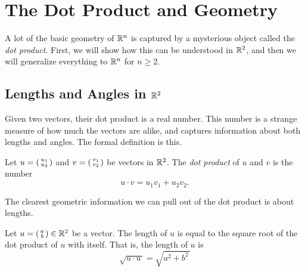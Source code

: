 \documentclass[elementsmain.tex]{subfiles}
\begin{document}
\section{The Dot Product and Geometry}

A lot of the basic geometry of $\mathbb{R}^n$ is captured by a mysterious object called the \emph{dot product}. First, we will show how this can be understood in $\R^2$, and then we will generalize everything to $\mathbb{R}^n$ for $n\geq 2$.

\subsection*{Lengths and Angles in $\R^2$}

Given two vectors, their dot product is a real number. This number is a strange measure of how much the vectors are alike, and captures information about both lengths and angles. The formal definition is this.

\begin{definition}
Let $u = \left(\begin{smallmatrix} u_1 \\ u_2 \end{smallmatrix}\right)$ and $v = \left(\begin{smallmatrix} v_1 \\ v_2 \end{smallmatrix}\right)$ be vectors in $\R^2$. 
The \emph{dot product} of $u$ and $v$ is the number
\[
u\cdot v = u_1v_1 + u_2v_2 .
\]
\end{definition}

The clearest geometric information we can pull out of the dot product is about lengths.

\begin{theorem}[Lengths in $\R^2$]
Let $u = \left(\begin{smallmatrix} a \\ b \end{smallmatrix}\right) \in \mathbb{R}^2$ be a vector. The length of $u$ is equal to the square root of the dot product of $u$ with itself. That is, the length of $u$ is
\[
\sqrt{u\cdot u\,} = \sqrt{a^2+b^2\,}
\]
\end{theorem}
\end{document}

